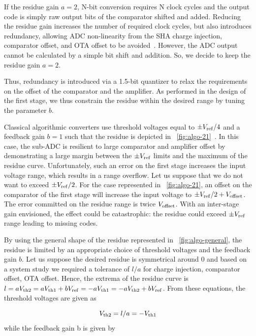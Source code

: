 If the residue gain \(a = 2\), N-bit conversion requires N clock cycles and the output code is simply raw output bits of the comparator shifted and added. Reducing the residue gain increases the number of required clock cycles, but also introduces redundancy, allowing ADC non-linearity from the SHA charge injection, comparator offset, and OTA offset to be avoided~\cite{Lewis1987}. However, the ADC output cannot be calculated by a simple bit shift and addition. So, we decide to keep the residue gain \(a = 2\).

Thus, redundancy is introduced via a 1.5-bit quantizer to relax the requirements on the offset of the comparator and the amplifier. As performed in the design of the first stage, we thus constrain the residue within the desired range by tuning the parameter $b$.

Classical algorithmic converters use threshold voltages equal to \(\pm V_{\rm ref}/4\) and a feedback gain \(b = 1\) such that the residue is depicted in \figurename~\ref{fig:algo-21}~\cite{Brooks2009,Naderi2017}. In this case, the sub-ADC is resilient to large comparator and amplifier offset by demonstrating a large margin between the \(\pm V_{\rm ref}\) limits and the maximum of the residue curve. Unfortunately, such an error on the first stage increases the input voltage range, which results in a range overflow. Let us suppose that we do not want to exceed $\pm V_{\rm ref}/2$. For the case represented in \figurename~\ref{fig:algo-21}, an offset on the comparator of the first stage will increase the input voltage to $\pm V_{\rm ref}/2+V_{\rm offset}$. The error committed on the residue range is twice $V_{\rm offset}$. With an inter-stage gain envisioned, the effect could be catastrophic: the residue could exceed $\pm V_{\rm ref}$ range leading to missing codes.

By using the general shape of the residue represented in \figurename~\ref{fig:algo-general}, the residue is limited by an appropriate choice of threshold voltages and the feedback gain \(b\). Let us suppose the desired residue is symmetrical around 0 and based on a system study we required a tolerance of \(l/a\) for charge injection, comparator offset, OTA offset. Hence, the extrema of the residue curve is \(l = aV_{\rm th2} = aV_{\rm th1}+bV_{\rm ref} = -aV_{\rm th1} = -aV_{\rm th2}+bV_{\rm ref}\). From these equations, the threshold voltages are given as

\begin{equation}
V_{\rm th2} = l/a = -V_{\rm th1}
\end{equation}
while the feedback gain b is given by

